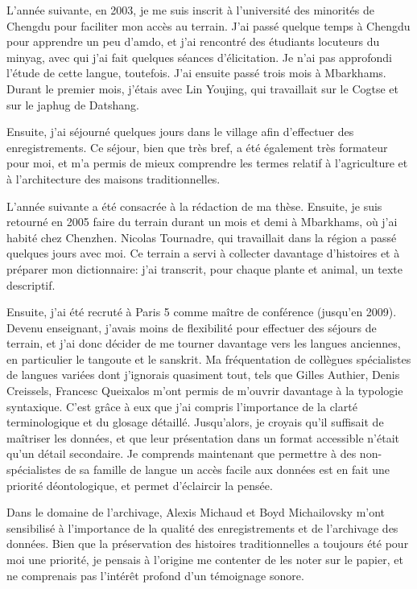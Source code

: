 \documentclass[oldfontcommands,oneside,a4paper,11pt]{memoir}
\begin{document}
L'année suivante, en 2003, je me suis inscrit à l'université des minorités de Chengdu pour faciliter mon accès au terrain. J'ai passé quelque temps à Chengdu pour apprendre un peu d'amdo, et j'ai rencontré des étudiants locuteurs du minyag, avec qui j'ai fait quelques séances d'élicitation. Je n'ai pas approfondi l'étude de cette langue, toutefois. J'ai ensuite passé trois mois à Mbarkhams. Durant le premier mois, j'étais avec Lin Youjing, qui travaillait sur le Cogtse et sur le japhug de Datshang.  

Ensuite, j'ai séjourné quelques jours dans le village afin d'effectuer des enregistrements. Ce séjour, bien que très bref, a été également très formateur pour moi, et m'a permis de mieux comprendre les termes relatif à l'agriculture et à l'architecture des maisons traditionnelles.

L'année suivante a été consacrée à la rédaction de ma thèse. Ensuite, je suis retourné en 2005 faire du terrain durant un mois et demi à Mbarkhams, où j'ai habité chez Chenzhen. Nicolas Tournadre, qui travaillait dans la région a passé quelques jours avec moi. Ce terrain a servi à collecter davantage d'histoires et à préparer mon dictionnaire: j'ai transcrit, pour chaque plante et animal, un texte descriptif.

Ensuite, j'ai été recruté à Paris 5 comme maître de conférence  (jusqu'en 2009). Devenu enseignant, j'avais moins de flexibilité pour effectuer des séjours de terrain, et j'ai donc décider de me tourner davantage vers les langues anciennes, en particulier le tangoute et le sanskrit. Ma fréquentation de collègues spécialistes de langues variées dont j'ignorais quasiment tout, tels que Gilles Authier, Denis Creissels, Francesc Queixalos m'ont permis de m'ouvrir davantage à la typologie syntaxique. C'est grâce à eux que j'ai compris l'importance de la clarté terminologique et du glosage détaillé. Jusqu'alors, je croyais qu'il suffisait de maîtriser les données, et que leur présentation dans un format accessible n'était qu'un détail secondaire. Je comprends maintenant que permettre à des non-spécialistes de sa famille de langue   un accès facile aux données est en fait une priorité déontologique, et permet   d'éclaircir la pensée.

Dans le domaine de l'archivage, Alexis Michaud et Boyd Michailovsky m'ont sensibilisé  à l'importance de la qualité des enregistrements et de l'archivage des données. Bien que la préservation des histoires traditionnelles a toujours été pour moi une priorité, je pensais à l'origine me contenter de les noter sur le papier, et ne comprenais pas l'intérêt profond d'un témoignage sonore. 
\end{document}
